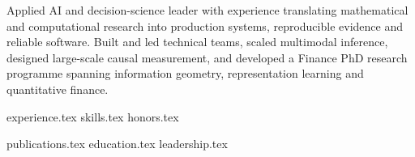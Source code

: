 \documentclass[11pt, a4paper]{awesome-cv}
\newcommand*{\sectiondir}{sections/}
\newcommand*{\cvprofile}[1]{%
  \begin{center}
    \begin{minipage}{0.97\textwidth}
      \fontsize{9pt}{1.35em}\bodyfontlight\color{text}#1
    \end{minipage}
  \end{center}
  \vspace{-1mm}
}
\begin{document}
\makecvheader

\cvprofile{Applied AI and decision-science leader with experience
  translating mathematical and computational research into production
  systems, reproducible evidence and reliable software. Built and led
  technical teams, scaled multimodal inference, designed large-scale
  causal measurement, and developed a Finance PhD research programme
  spanning information geometry, representation learning and
quantitative finance.}

{experience.tex}
{skills.tex}
{honors.tex}

\newpage

{publications.tex}
{education.tex}
{leadership.tex}
\end{document}
